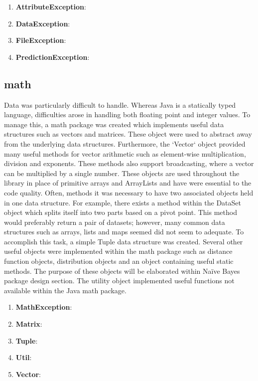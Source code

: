 \documentclass[11pt]{article}
\newcommand{\bb}{\textbf}
\begin{document}
\begin{enumerate}[leftmargin=*]
  \item[] \bb{AttributeException}:
  \item[] \bb{DataException}:
  \item[] \bb{FileException}:
  \item[] \bb{PredictionException}:
\end{enumerate}

\subsection{math}
Data was particularly difficult to handle. Whereas Java is a statically typed language, difficulties arose in handling both floating point and integer values. To manage this, a math package was created which implements useful data structures such as vectors and matrices. These object were used to abstract away from the underlying data structures. Furthermore, the `Vector` object provided many useful methods for vector arithmetic such as element-wise multiplication, division and exponents. These methods also support broadcasting, where a vector can be multiplied by a single number. These objects are used throughout the library in place of primitive arrays and ArrayLists and have were essential to the code quality. Often, methods it was necessary to have two associated objects held in one data structure. For example, there exists a method within the DataSet object which splits itself into two parts based on a pivot point. This method would preferably return a pair of datasets; however, many common data structures such as arrays, lists and maps seemed did not seem to adequate. To accomplish this task, a simple Tuple data structure was created. Several other useful objects were implemented within the math package such as distance function objects, distribution objects and an object containing useful static methods. The purpose of these objects will be elaborated within Naïve Bayes package design section. The utility object implemented useful functions not available within the Java math package.

\begin{enumerate}[leftmargin=*]
  \item[] \bb{MathException}:
  \item[] \bb{Matrix}:
  \item[] \bb{Tuple}:
  \item[] \bb{Util}:
  \item[] \bb{Vector}:
\end{enumerate}
\end{document}
